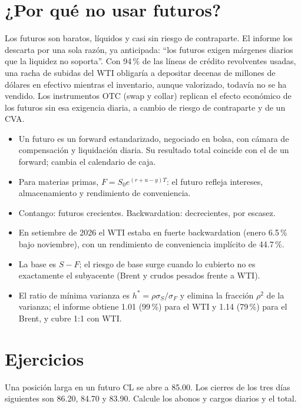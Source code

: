 \section{¿Por qué no usar futuros?}

Los futuros son baratos, líquidos y casi sin riesgo de contraparte. El informe los descarta por una sola razón, ya anticipada: \enquote{los futuros exigen márgenes diarios que la liquidez no soporta}. Con 94\,\% de las líneas de crédito revolventes usadas, una racha de subidas del WTI obligaría a depositar decenas de millones de dólares en efectivo mientras el inventario, aunque valorizado, todavía no se ha vendido. Los instrumentos OTC (swap y collar) replican el efecto económico de los futuros sin esa exigencia diaria, a cambio de riesgo de contraparte y de un CVA.

\begin{resumen}
\begin{itemize}
\item Un futuro es un forward estandarizado, negociado en bolsa, con cámara de compensación y liquidación diaria. Su resultado total coincide con el de un forward; cambia el calendario de caja.
\item Para materias primas, $F=S_0e^{(r+u-y)T}$: el futuro refleja intereses, almacenamiento y rendimiento de conveniencia.
\item Contango: futuros crecientes. Backwardation: decrecientes, por escasez.
\item En setiembre de 2026 el WTI estaba en fuerte backwardation (enero 6.5\,\% bajo noviembre), con un rendimiento de conveniencia implícito de 44.7\,\%.
\item La base es $S-F$; el riesgo de base surge cuando lo cubierto no es exactamente el subyacente (Brent y crudos pesados frente a WTI).
\item El ratio de mínima varianza es $h^*=\rho\sigma_S/\sigma_F$ y elimina la fracción $\rho^2$ de la varianza; el informe obtiene 1.01 (99\,\%) para el WTI y 1.14 (79\,\%) para el Brent, y cubre 1:1 con WTI.
\end{itemize}
\end{resumen}

\section*{Ejercicios}

\ejercicio[cálculo] Una posición larga en un futuro CL se abre a 85.00. Los cierres de los tres días siguientes son 86.20, 84.70 y 83.90. Calcule los abonos y cargos diarios y el total.

